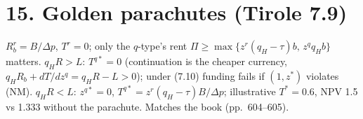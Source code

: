 \documentclass[11pt,a4paper]{article}
\newcommand{\dpp}{\Delta p}
\begin{document}
\section*{15. Golden parachutes (Tirole 7.9)}
$R_b^r=B/\dpp$, $T^r=0$; only the $q$-type's rent $\Pi\ge\max\{z^r(q_H-\tau)b,\,z^qq_Hb\}$ matters.
$q_HR>L$: $T^{q*}=0$ (continuation is the cheaper currency, $q_HR_b+dT/dz^q=q_HR-L>0$); under (7.10)
funding fails if $(1,z^*)$ violates (NM). $q_HR<L$: $z^{q*}=0$, $T^{q*}=z^r(q_H-\tau)B/\dpp$; illustrative
$T^*=0.6$, NPV 1.5 vs 1.333 without the parachute. Matches the book (pp.~604--605).
\end{document}
